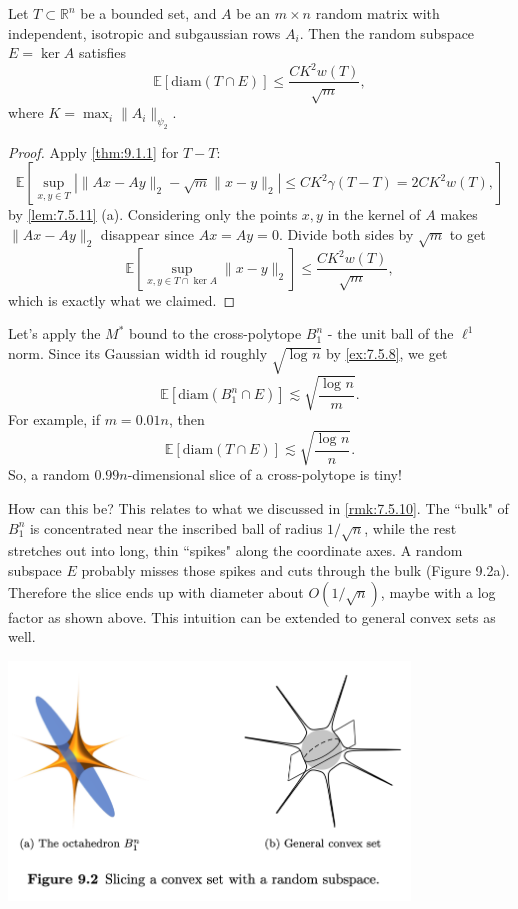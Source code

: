 \begin{theorem}[$M^*$ bound]
\label{thm:9.3.1}
Let $T \subset \mathbb{R}^n$ be a bounded set, and $A$ be an $m \times n$ random matrix with independent, 
isotropic and subgaussian rows $A_i$. Then the random subspace $E = \ker{A}$ satisfies 
\[ \mathbb{E}\left[ \mathrm{diam}(T \cap E) \right] \leq \frac{CK^2 w(T)}{\sqrt{m}}, \]
where $K = \max_{i}\lVert A_i \rVert_{\psi_2}$.
\end{theorem}

\begin{proof}
Apply \cref{thm:9.1.1} for $T - T$:
\[ \mathbb{E}\left[ \sup_{x, y \in T} \left| \lVert Ax - Ay \rVert_{2} - \sqrt{m}\lVert x - y \rVert_{2} \right| 
\leq CK^2 \gamma(T - T) = 2CK^2 w(T), \right] \]
by \cref{lem:7.5.11} (a). Considering only the points $x, y$ in the kernel of $A$ makes $\lVert Ax - Ay 
\rVert_{2}$ disappear since $Ax = Ay = 0$. Divide both sides by $\sqrt{m}$ to get 
\[ \mathbb{E}\left[ \sup_{x, y \in T \cap \ker{A}} \lVert x - y \rVert_{2} \right] 
\leq \frac{CK^2 w(T)}{\sqrt{m}}, \]
which is exactly what we claimed.
\end{proof}

\begin{example}
Let's apply the $M^*$ bound to the cross-polytope $B_1^n$ - the unit ball of the $\ell^1$ norm. Since its 
Gaussian width id roughly $\sqrt{\log_{}{n}}$ by \cref{ex:7.5.8}, we get 
\[ \mathbb{E}\left[ \mathrm{diam}(B_1^n \cap E) \right] \lesssim \sqrt{\frac{\log_{}{n}}{m}}. \]
For example, if $m = 0.01n$, then 
\[ \mathbb{E}\left[ \mathrm{diam}(T \cap E) \right] \lesssim \sqrt{\frac{\log_{}{n}}{n}}. \]
So, a random $0.99n$-dimensional slice of a cross-polytope is tiny!
\end{example}

How can this be? This relates to what we discussed in \cref{rmk:7.5.10}. The ``bulk" of $B_1^n$ is concentrated 
near the inscribed ball of radius $1/\sqrt{n}$, while the rest stretches out into long, thin ``spikes" along 
the coordinate axes. A random subspace $E$ probably misses those spikes and cuts through the bulk (Figure 9.2a). 
Therefore the slice ends up with diameter about $O(1/\sqrt{n})$, maybe with a log factor as shown above. This 
intuition can be extended to general convex sets as well.

\begin{center}
	\includegraphics[width=0.8\textwidth]{Chapter 9/fig9-2.png}
\end{center}

